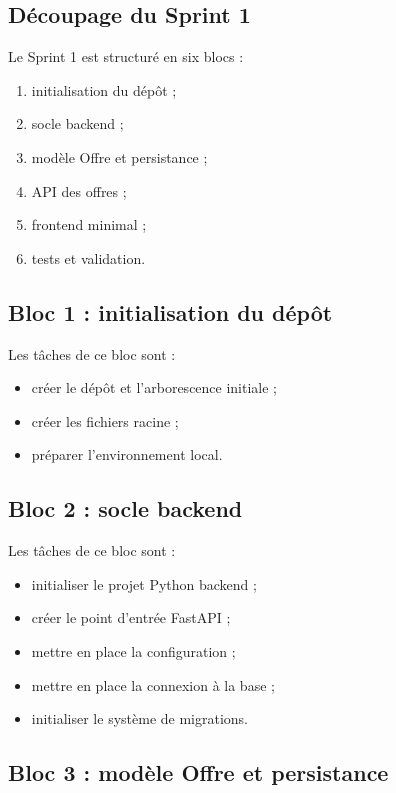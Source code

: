 \documentclass[11pt,a4paper]{article}
\begin{document}
\subsection{Découpage du Sprint 1}

Le Sprint 1 est structuré en six blocs :

\begin{enumerate}
    \item initialisation du dépôt ;
    \item socle backend ;
    \item modèle Offre et persistance ;
    \item API des offres ;
    \item frontend minimal ;
    \item tests et validation.
\end{enumerate}

\subsection{Bloc 1 : initialisation du dépôt}

Les tâches de ce bloc sont :

\begin{itemize}
    \item créer le dépôt et l’arborescence initiale ;
    \item créer les fichiers racine ;
    \item préparer l’environnement local.
\end{itemize}

\subsection{Bloc 2 : socle backend}

Les tâches de ce bloc sont :

\begin{itemize}
    \item initialiser le projet Python backend ;
    \item créer le point d’entrée FastAPI ;
    \item mettre en place la configuration ;
    \item mettre en place la connexion à la base ;
    \item initialiser le système de migrations.
\end{itemize}

\subsection{Bloc 3 : modèle Offre et persistance}
\end{document}
